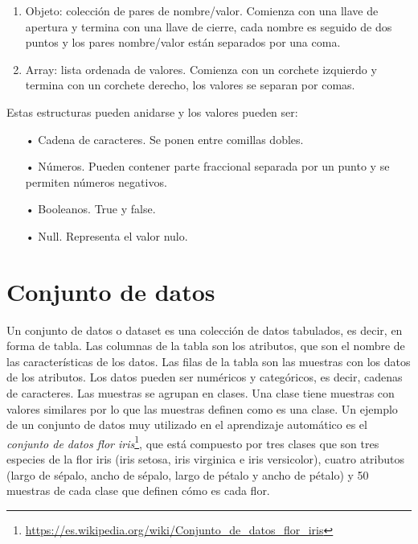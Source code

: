 \documentclass[a4paper, 12pt]{book}
\begin{document}
\begin{enumerate}
	\item Objeto: colección de pares de nombre/valor. Comienza con una llave de apertura y termina con una llave de cierre, cada nombre es seguido de dos puntos y los pares nombre/valor están separados por una coma.
	\item Array: lista ordenada de valores. Comienza con un corchete izquierdo y termina con un corchete derecho, los valores se separan por comas.
\end{enumerate}

Estas estructuras pueden anidarse y los valores pueden ser:
	\begin{itemize}
		\item[•] Cadena de caracteres. Se ponen entre comillas dobles.
		\item[•] Números. Pueden contener parte fraccional separada por un punto y se permiten números negativos.
		\item[•] Booleanos. True y false.
		\item[•] Null. Representa el valor nulo.
	\end{itemize}

\section{Conjunto de datos} 
\label{sec:dataset}

Un conjunto de datos o dataset es una colección de datos tabulados, es decir, en forma de tabla. 
Las columnas de la tabla son los atributos, que son el nombre de las características de los datos. 
Las filas de la tabla son las muestras con los datos de los atributos. Los datos pueden ser numéricos y categóricos, es decir, cadenas de caracteres. 
Las muestras se agrupan en clases. Una clase tiene muestras con valores similares por lo que las muestras definen como es una clase. 
Un ejemplo de un conjunto de datos muy utilizado en el aprendizaje automático es el \emph{conjunto de datos flor iris}\footnote{\url{https://es.wikipedia.org/wiki/Conjunto_de_datos_flor_iris}}, que está compuesto por tres clases que son tres especies de la flor iris (iris setosa, iris virginica e iris versicolor), cuatro atributos (largo de sépalo, ancho de sépalo, largo de pétalo y ancho de pétalo) y 50 muestras de cada clase que definen cómo es cada flor.

\end{document}
